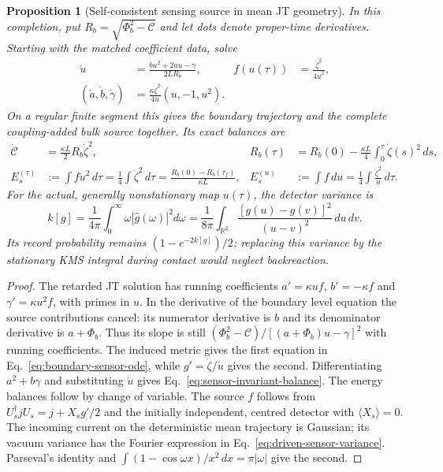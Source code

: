 \documentclass[12pt,a4paper]{article}
\newtheorem{proposition}[theorem]{Proposition}
\begin{document}
\begin{proposition}[Self-consistent sensing source in mean JT geometry]
\label{prop:driven-boundary-sensor}
In this completion, put $R_b=\sqrt{\Phi_b^2-\mathcal C}$ and let dots denote
proper-time derivatives. Starting with the matched coefficient data, solve
\begin{align}
 \dot u&=\frac{bu^2+2au-\gamma}{2LR_b},&
 f(u(\tau))&=\frac{\dot\zeta^2}{4\dot u^2},\nonumber\\
 (\dot a,\dot b,\dot\gamma)&=
       \frac{\kappa\dot\zeta^2}{4\dot u}(u,-1,u^2).
 \label{eq:boundary-sensor-ode}
\end{align}
On a regular finite segment this gives the boundary trajectory and the complete
coupling-added bulk source together. Its exact balances are
\begin{align}
 \dot{\mathcal C}&=\frac{\kappa L}{2}R_b\dot\zeta^2,&
 R_b(\tau)&=R_b(0)-\frac{\kappa L}{4}
               \int_0^\tau\dot\zeta(s)^2\,ds,\label{eq:sensor-invariant-balance}\\
 E_s^{(\tau)}&:=\int f\dot u^2\,d\tau
       =\frac14\int\dot\zeta^2\,d\tau
       =\frac{R_b(0)-R_b(\tau_f)}{\kappa L},&
 E_s^{(u)}&:=\int f\,du
       =\frac14\int\frac{\dot\zeta^2}{\dot u}\,d\tau.
 \label{eq:sensor-energy-balance}
\end{align}
For the actual, generally nonstationary map $u(\tau)$, the detector variance is
\begin{equation}\label{eq:driven-sensor-variance}
 k[g]=\frac{1}{4\pi}\int_0^\infty\omega|\widehat g(\omega)|^2d\omega
     =\frac{1}{8\pi}\int_{\mathbb R^2}
       \frac{[g(u)-g(v)]^2}{(u-v)^2}\,du\,dv.
\end{equation}
Its record probability remains $(1-e^{-2k[g]})/2$; replacing this variance by
the stationary KMS integral during contact would neglect backreaction.
\end{proposition}
\begin{proof}
The retarded JT solution has running coefficients
$a'=\kappa u f$, $b'=-\kappa f$ and $\gamma'=\kappa u^2 f$, with primes in
$u$. In the derivative of the boundary level equation the source contributions
cancel: its numerator derivative is $b$ and its denominator derivative is
$a+\Phi_b$. Thus its slope is still
$(\Phi_b^2-\mathcal C)/[(a+\Phi_b)u-\gamma]^2$ with running coefficients.
The induced metric gives the first equation in
Eq.~\eqref{eq:boundary-sensor-ode}, while $g'=\dot\zeta/\dot u$ gives the
second. Differentiating $a^2+b\gamma$ and substituting $\dot u$ gives
Eq.~\eqref{eq:sensor-invariant-balance}. The energy balances follow by change
of variable. The source $f$ follows from $U_s^\dagger jU_s=j+X_sg'/2$ and
the initially independent, centred detector with $\langle X_s\rangle=0$.
The incoming current on the deterministic mean trajectory is Gaussian; its
vacuum variance has the Fourier expression in
Eq.~\eqref{eq:driven-sensor-variance}. Parseval's
identity and $\int(1-\cos\omega x)/x^2\,dx=\pi|\omega|$ give the second.
\end{proof}
\end{document}
